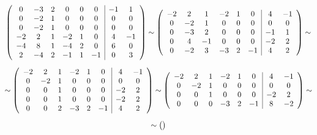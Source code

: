 \documentclass[11pt]{article}
\begin{document}
$$
\begin{gathered}
\begin{pmatrix}
\begin{array}{c c c c c c|c c}
0 & -3 & 2 & 0 & 0 & 0 & -1 & 1\\
0 & -2 & 1 & 0 & 0 & 0 & 0 & 0\\
0 & -2 & 1 & 0 & 0 & 0 & 0 & 0\\
-2 & 2 & 1 & -2 & 1 & 0 & 4 & -1\\
-4 & 8 & 1 & -4 & 2 & 0 & 6 & 0\\
2 & -4 & 2 & -1 & 1 & -1 & 0 & 3
\end{array}
\end{pmatrix} \sim
\begin{pmatrix}
\begin{array}{c c c c c c|c c}
-2 & 2 & 1 & -2 & 1 & 0 & 4 & -1 \\
0 & -2 & 1 & 0 & 0 & 0 & 0 & 0 \\
0 & -3 & 2 & 0 & 0 & 0 & -1 & 1 \\
0 & 4 & -1 & 0 & 0 & 0 & -2 & 2 \\
0 & -2 & 3 & -3 & 2 & -1 & 4 & 2
\end{array}
\end{pmatrix} \sim \\[6pt] \sim
\begin{pmatrix}
\begin{array}{c c c c c c|c c}
-2 & 2 & 1 & -2 & 1 & 0 & 4 & -1 \\
0 & -2 & 1 & 0 & 0 & 0 & 0 & 0 \\
0 & 0 & 1 & 0 & 0 & 0 & -2 & 2 \\
0 & 0 & 1 & 0 & 0 & 0 & -2 & 2 \\
0 & 0 & 2 & -3 & 2 & -1 & 4 & 2
\end{array}
\end{pmatrix} \sim
\begin{pmatrix}
\begin{array}{c c c c c c|c c}
-2 & 2 & 1 & -2 & 1 & 0 & 4 & -1 \\
0 & -2 & 1 & 0 & 0 & 0 & 0 & 0 \\
0 & 0 & 1 & 0 & 0 & 0 & -2 & 2 \\
0 & 0 & 0 & -3 & 2 & -1 & 8 & -2 \\
\end{array}
\end{pmatrix} \sim \\[6pt] \sim
\begin{pmatrix}
\begin{array}{c c c c c c|c c}

\end{array}
\end{pmatrix}
\end{gathered}$$
\end{document}
